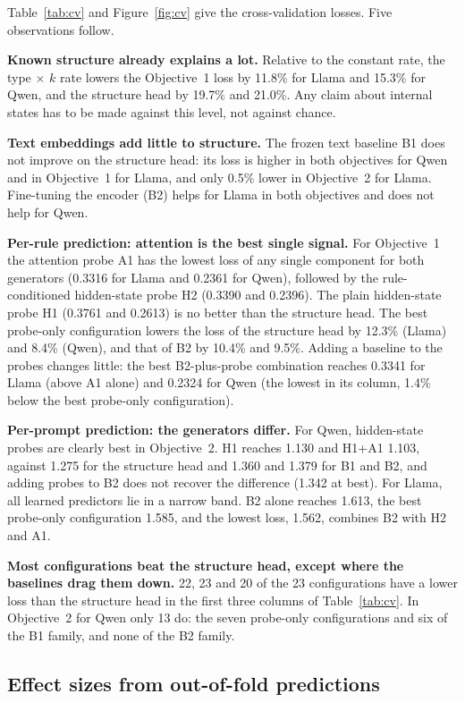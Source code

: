 \documentclass[10pt]{article}
\begin{document}
Table~\ref{tab:cv} and Figure~\ref{fig:cv} give the cross-validation losses. Five observations follow.

\textbf{Known structure already explains a lot.} Relative to the constant rate, the type $\times$ $k$ rate lowers the
Objective~1 loss by 11.8\% for Llama and 15.3\% for Qwen, and the structure head by 19.7\% and 21.0\%. Any claim about
internal states has to be made against this level, not against chance.

\textbf{Text embeddings add little to structure.} The frozen text baseline B1 does not improve on the structure head:
its loss is higher in both objectives for Qwen and in Objective~1 for Llama, and only 0.5\% lower in Objective~2 for Llama. Fine-tuning the encoder (B2) helps for Llama in both objectives and does not help for Qwen.

\textbf{Per-rule prediction: attention is the best single signal.} For Objective~1 the attention probe A1 has the
lowest loss of any single component for both generators (0.3316 for Llama and 0.2361 for Qwen), followed by the
rule-conditioned hidden-state probe H2 (0.3390 and 0.2396). The plain hidden-state probe H1 (0.3761 and 0.2613) is no
better than the structure head. The best probe-only configuration lowers the loss of the structure head by 12.3\%
(Llama) and 8.4\% (Qwen), and that of B2 by 10.4\% and 9.5\%. Adding a baseline to the probes changes little: the best
B2-plus-probe combination reaches 0.3341 for Llama (above A1 alone) and 0.2324 for Qwen (the lowest in its column, 1.4\%
below the best probe-only configuration).

\textbf{Per-prompt prediction: the generators differ.} For Qwen, hidden-state probes are clearly best in Objective~2.
H1 reaches 1.130 and H1+A1 1.103, against 1.275 for the structure head and 1.360 and 1.379 for B1 and B2, and adding
probes to B2 does not recover the difference (1.342 at best). For Llama, all learned predictors lie in a narrow band.
B2 alone reaches 1.613, the best probe-only configuration 1.585, and the lowest loss, 1.562, combines B2 with H2 and
A1.

\textbf{Most configurations beat the structure head, except where the baselines drag them down.} 22, 23 and 20 of the
23 configurations have a lower loss than the structure head in the first three columns of Table~\ref{tab:cv}. In
Objective~2 for Qwen only 13 do: the seven probe-only configurations and six of the B1 family, and none of the B2
family.

\subsection{Effect sizes from out-of-fold predictions}
\end{document}
